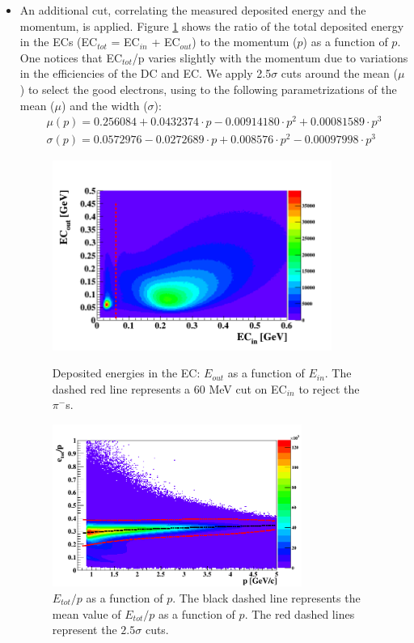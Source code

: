 \begin{itemize}
\begin{itemize}
\item An additional cut, correlating the measured deposited energy and the momentum, is applied. Figure \ref{fig:etot_p_cut} shows the ratio of the total deposited energy in the ECs (EC$_{tot}$ = EC$_{in}$ + EC$_{out}$) to the momentum ($p$) as a function of $p$. One notices that EC$_{tot}$/p varies slightly with the momentum due to variations in the efficiencies of the DC and EC. We apply 2.5$\sigma$ cuts around the mean ($\mu$) to select the good electrons, using to the following parametrizations of the mean ($\mu$) and the width ($\sigma$):
\begin{eqnarray}
\mu (p) = 0.256084 +0.0432374\cdot p -0.00914180\cdot p^{2} +0.00081589 \cdot p^{3} \\
\sigma (p) = 0.0572976 -0.0272689\cdot p +0.008576\cdot p^{2} -0.00097998\cdot p^{3}
\end{eqnarray}

   
\begin{figure}[tp]
\begin{minipage}[c]{.46\linewidth}
\hspace{-0.3in}
\includegraphics[height=6.2cm]{fig_analysis/eco_eci.png}
\caption{Deposited energies in the EC: $E_{out}$ as a function of $E_{in}$. The dashed red line represents a 60 MeV cut on EC$_{in}$ to reject the $\pi^{-}$s. } 
\label{fig:Einner_cut}
\end{minipage} \hfill
\begin{minipage}[c]{.46\linewidth}
\hspace{-0.2in}
\includegraphics[height=5.3cm]{fig_analysis/etot_p.png}
\caption{$E_{tot}/p$ as a function of $p$. The black dashed line represents the mean value of $E_{tot}/p$ as a function of $p$. The red dashed lines represent the $2.5 \sigma$ cuts. } 
\label{fig:etot_p_cut}
\end{minipage}
\end{figure}


\end{itemize}
\end{itemize}
